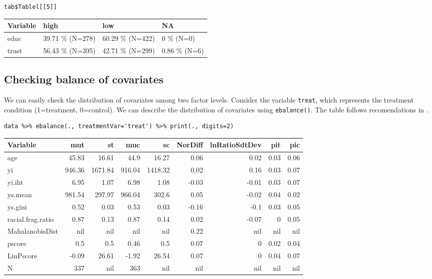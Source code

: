 \documentclass[a4paper]{article}
\begin{document}
\lstset{numbers=left,language=r,label=org281b1bd,caption= ,captionpos=b}
\begin{lstlisting}
tab$Tablel[[5]]
\end{lstlisting}

\begin{center}
\begin{tabular}{llll}
Variable & high & low & NA\\
\hline
educ & 39.71 \% (N=278) & 60.29 \% (N=422) & 0 \% (N=0)\\
trust & 56.43 \% (N=395) & 42.71 \% (N=299) & 0.86 \% (N=6)\\
\end{tabular}
\end{center}

\subsection{Checking balance of covariates}
\label{sec:orgdce44fd}

We can easily check the distribution of covariates among two factor levels. Consider the variable \texttt{treat}, which represents the treatment condition (1=treatment, 0=control). We can describe the distribution of covariates using \texttt{ebalance()}. The table follows recomendations in \cite{imbens2015causal}.

\lstset{numbers=left,language=r,label=org4f09d32,caption= ,captionpos=b}
\begin{lstlisting}
data %>% ebalance(., treatmentVar='treat') %>% print(., digits=2)

\end{lstlisting}

\begin{center}
\begin{tabular}{lrrrrrrrr}
Variable & mut & st & muc & sc & NorDiff & lnRatioSdtDev & pit & pic\\
\hline
age & 45.83 & 16.61 & 44.9 & 16.27 & 0.06 & 0.02 & 0.03 & 0.06\\
yi & 946.36 & 1671.84 & 916.04 & 1418.32 & 0.02 & 0.16 & 0.03 & 0.07\\
yi.iht & 6.95 & 1.07 & 6.98 & 1.08 & -0.03 & -0.01 & 0.03 & 0.07\\
ys.mean & 981.54 & 297.97 & 966.04 & 302.6 & 0.05 & -0.02 & 0.04 & 0.02\\
ys.gini & 0.52 & 0.03 & 0.53 & 0.03 & -0.16 & -0.1 & 0.03 & 0.05\\
racial.frag.ratio & 0.87 & 0.13 & 0.87 & 0.14 & 0.02 & -0.07 & 0 & 0.05\\
MahalanobisDist & nil & nil & nil & nil & 0.22 & nil & nil & nil\\
pscore & 0.5 & 0.5 & 0.46 & 0.5 & 0.07 & 0 & 0.02 & 0.04\\
LinPscore & -0.09 & 26.61 & -1.92 & 26.54 & 0.07 & 0 & 0.04 & 0.07\\
N & 337 & nil & 363 & nil & nil & nil & nil & nil\\
\end{tabular}
\end{center}
\end{document}

